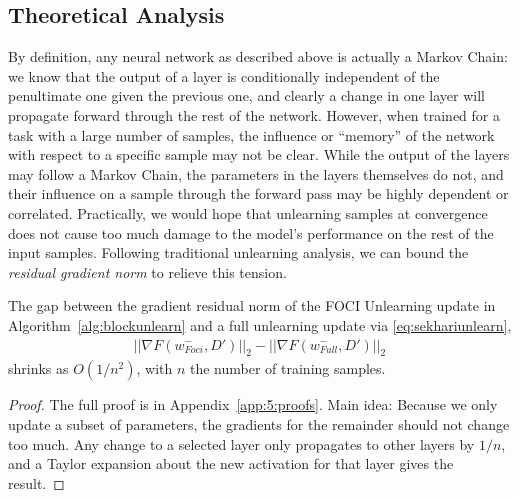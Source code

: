 \subsection{Theoretical Analysis}
By definition, any neural network as described above is actually a Markov Chain: we know that the output of a layer is conditionally independent of the penultimate one given the previous one, and clearly a change in one layer will propagate forward through the rest of the network.
However, when trained for a task with a large number of samples, the influence or ``memory'' of the network with respect to a specific sample may not be clear.
While the output of the layers may follow a Markov Chain, the parameters in the layers themselves do not, and their influence on a sample through the forward pass may be highly dependent or correlated.
Practically, we would hope that unlearning samples at convergence does not cause too much damage to the model's performance on the rest of the input samples.
Following traditional unlearning analysis, we can bound the \textit{residual gradient norm} to relieve this tension.
\begin{lemma}
The gap between the gradient residual norm of the FOCI Unlearning update in Algorithm~\ref{alg:blockunlearn} and a full unlearning update via \eqref{eq:sekhariunlearn},
\begin{align}
||\nabla F(w^-_{Foci},D')||_2 - ||\nabla F(w^-_{Full},D')||_2
\end{align}
shrinks as $O(1/n^2)$, with $n$ the number of training samples.
\end{lemma}
\begin{proof}
The full proof is in Appendix~\ref{app:5:proofs}. Main idea: Because we only update a subset of parameters, the gradients for the remainder should not change too much. Any change to a selected layer only propagates to other layers by $1/n$, and a Taylor expansion about the new activation for that layer gives the result.
\end{proof}


